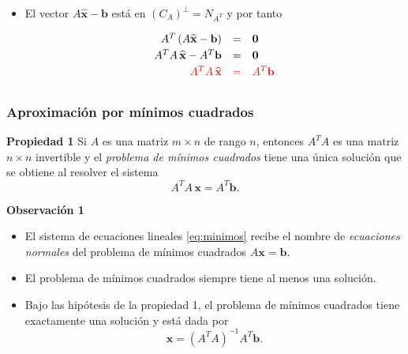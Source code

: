 \begin{frame}
\begin{itemize}

		\vspace{1mm}
		\item El vector $A\mathbf{\widehat{x}}-\mathbf{b}$ está en ${\left(C_A\right)}^{\perp} = N_{A^T}$ y por tanto
		
		\vspace{-0mm}
		\[
		\begin{array}{rcl}
		A^T \left(A\mathbf{\widehat{x}} - \mathbf{b} \right) & =               & \mathbf{0} \\[1mm]
		A^TA\,\mathbf{\widehat{x}} - A^T\mathbf{b} & =               & \mathbf{0} \\[1mm]
		{\color{red} A^TA\, \mathbf{\widehat{x}} } & {\color{red} =} & {\color{red} A^T\mathbf{b}} 
		\end{array}
		\]
	\end{itemize}
		
\end{frame}


\subsection{}

{\nologo
\begin{frame}\frametitle{Aproximación por mínimos cuadrados}
	
	\begin{prop}{\textbf{Propiedad 1}}
		\justifying
		Si $A$ es una matriz $m\times n$ de rango $n$, entonces $A^TA$ es una matriz $n\times n$ 
		invertible y el \textit{problema de mínimos cuadrados} tiene una única 
		solución que se obtiene al resolver el sistema
		\begin{equation}\label{eq:minimos}
			A^TA\, \mathbf{x} = A^T\mathbf{b}.
		\end{equation}
	\end{prop}		
	
		\begin{alertblock}{\textbf{Observación 1}}
		\begin{itemize}\justifying
			\item[\labelname{$a$}] El sistema de ecuaciones lineales \eqref{eq:minimos} recibe el 
			nombre de \textit{ecuaciones normales} del problema de mínimos cuadrados 
			$A\mathbf{x} = \mathbf{b}$.
			\item[\labelname{$b$}] El problema de mínimos cuadrados siempre tiene al menos una solución.
			\item[\labelname{$c$}] Bajo las hipótesis de la propiedad 1, el problema de mínimos cuadrados 
			tiene exactamente una solución y está dada por
			\[
				\mathbf{x} = \left( A^TA \right)^{-1} A^T \mathbf{b}.
			\]
		\end{itemize}
	\end{alertblock}

\end{frame}
}


